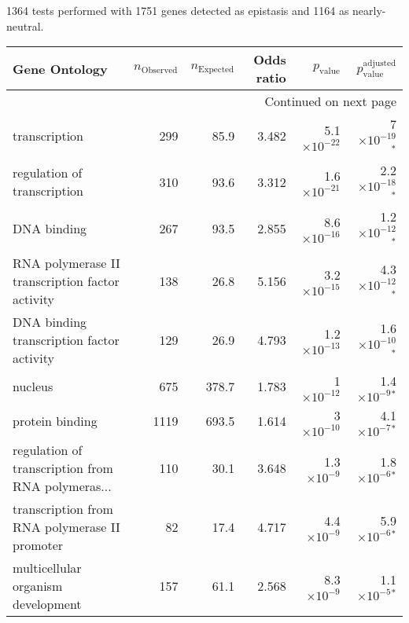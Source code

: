 1364 tests performed with 1751 genes detected as epistasis and 1164 as nearly-neutral.
\scriptsize
\begin{longtable}{|l|r|r|r|r|r|}
\toprule
                                     Gene Ontology & $n_{\mathrm{Observed}}$ & $n_{\mathrm{Expected}}$ & Odds ratio &     $p_{\mathrm{value}}$ &      $p_{\mathrm{value}}^{\mathrm{adjusted}}$ \\
\midrule
\endhead
\midrule
\multicolumn{6}{r}{{Continued on next page}} \\
\midrule
\endfoot

\bottomrule
\endlastfoot
                                     transcription &                     299 &                    85.9 &      3.482 & 5.1$\times 10^{-22}$ &    7$\times 10^{-19}$$\bm{^*}$ \\
                       regulation of transcription &                     310 &                    93.6 &      3.312 & 1.6$\times 10^{-21}$ &  2.2$\times 10^{-18}$$\bm{^*}$ \\
                                       DNA binding &                     267 &                    93.5 &      2.855 & 8.6$\times 10^{-16}$ &  1.2$\times 10^{-12}$$\bm{^*}$ \\
   RNA polymerase II transcription factor activity &                     138 &                    26.8 &      5.156 & 3.2$\times 10^{-15}$ &  4.3$\times 10^{-12}$$\bm{^*}$ \\
         DNA binding transcription factor activity &                     129 &                    26.9 &      4.793 & 1.2$\times 10^{-13}$ &  1.6$\times 10^{-10}$$\bm{^*}$ \\
                                           nucleus &                     675 &                   378.7 &      1.783 &   1$\times 10^{-12}$ &   1.4$\times 10^{-9}$$\bm{^*}$ \\
                                   protein binding &                    1119 &                   693.5 &      1.614 &   3$\times 10^{-10}$ &   4.1$\times 10^{-7}$$\bm{^*}$ \\
 regulation of transcription from RNA polymeras... &                     110 &                    30.1 &      3.648 &  1.3$\times 10^{-9}$ &   1.8$\times 10^{-6}$$\bm{^*}$ \\
     transcription from RNA polymerase II promoter &                      82 &                    17.4 &      4.717 &  4.4$\times 10^{-9}$ &   5.9$\times 10^{-6}$$\bm{^*}$ \\
                multicellular organism development &                     157 &                    61.1 &      2.568 &  8.3$\times 10^{-9}$ &   1.1$\times 10^{-5}$$\bm{^*}$ \\

\end{longtable}
